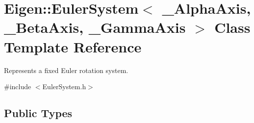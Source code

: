 \hypertarget{class_eigen_1_1_euler_system}{}\section{Eigen\+:\+:Euler\+System$<$ \+\_\+\+Alpha\+Axis, \+\_\+\+Beta\+Axis, \+\_\+\+Gamma\+Axis $>$ Class Template Reference}
\label{class_eigen_1_1_euler_system}


Represents a fixed Euler rotation system.  




{\ttfamily \#include $<$Euler\+System.\+h$>$}

\subsection*{Public Types}
